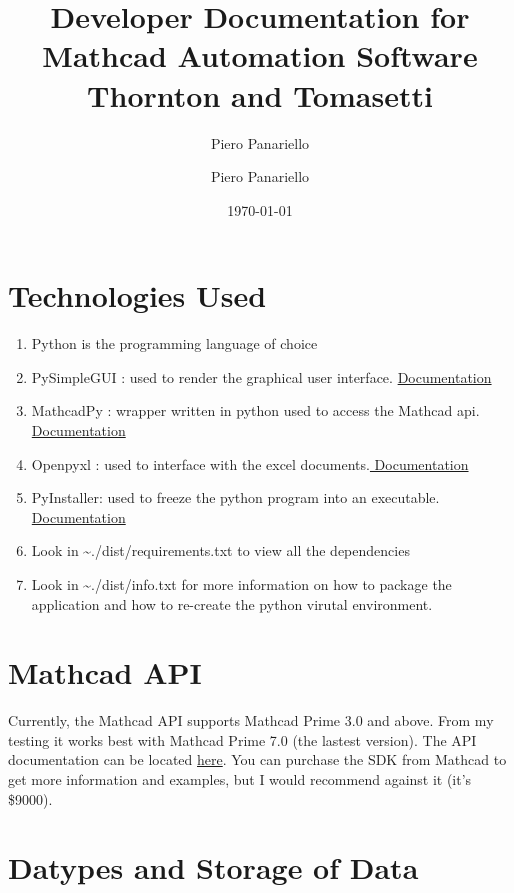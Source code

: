 \documentclass[11pt]{article}
\author{Piero Panariello}
\author{Piero Panariello}
\date{\today}
\title{Developer Documentation for Mathcad Automation Software\\\medskip
\large Thornton and Tomasetti}
\begin{document}
\maketitle
\tableofcontents


\section{Technologies Used}
\label{sec:org7854667}
\begin{enumerate}
\item Python is the programming language of choice
\item PySimpleGUI : used to render the graphical user interface. \href{https://pysimplegui.readthedocs.io/en/latest/}{Documentation}
\item MathcadPy : wrapper written in python used to access the Mathcad api. \href{https://github.com/MattWoodhead/MathcadPy/blob/master/MathcadPy/\_application.py}{Documentation}
\item Openpyxl : used to interface with the excel documents.\href{https://openpyxl.readthedocs.io/en/stable/}{ Documentation}
\item PyInstaller: used to freeze the python program into an executable.\href{https://pyinstaller.readthedocs.io/en/stable/}{ Documentation}
\item Look in \textasciitilde{}./dist/requirements.txt to view all the dependencies
\item Look in \textasciitilde{}./dist/info.txt for more information on how to package the application and how to re-create the python virutal environment.
\end{enumerate}

\section{Mathcad API}
\label{sec:org628ebf9}
Currently, the Mathcad API supports Mathcad Prime 3.0 and above. From my testing it works best with Mathcad Prime 7.0 (the lastest version). The API documentation can be located \href{https://support.ptc.com/help/mathcad/r7.0/en/index.html\#page/PTC\_Mathcad\_Help\%2Fmathcad\_and\_automation\_api.html\%23}{here}. You can purchase the SDK from Mathcad to get more information and examples, but I would recommend against it (it's \$9000).
\section{Datypes and Storage of Data}
\label{sec:org384616c}
\end{document}
